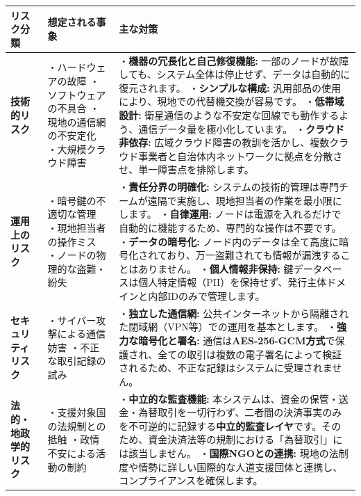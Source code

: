 \documentclass[
  a4paper,
  ja=standard,
  xelatex]{bxjsarticle}
\begin{document}
\begin{longtable}[]{@{}
  >{\raggedright\arraybackslash}p{}
  >{\raggedright\arraybackslash}p{}
  >{\raggedright\arraybackslash}p{}@{}}
\toprule\noalign{}
\begin{minipage}[b]{\linewidth}\raggedright
リスク分類
\end{minipage} & \begin{minipage}[b]{\linewidth}\raggedright
想定される事象
\end{minipage} & \begin{minipage}[b]{\linewidth}\raggedright
主な対策
\end{minipage} \\
\midrule\noalign{}
\endhead
\bottomrule\noalign{}
\endlastfoot
\textbf{技術的リスク} & ・ハードウェアの故障 ・ソフトウェアの不具合
・現地の通信網の不安定化 ・大規模クラウド障害 &
・\textbf{機器の冗長化と自己修復機能:}
一部のノードが故障しても、システム全体は停止せず、データは自動的に復元されます。
・\textbf{シンプルな構成:}
汎用部品の使用により、現地での代替機交換が容易です。
・\textbf{低帯域設計:}
衛星通信のような不安定な回線でも動作するよう、通信データ量を極小化しています。
・\textbf{クラウド非依存:}
広域クラウド障害の教訓を活かし、複数クラウド事業者と自治体内ネットワークに拠点を分散させ、単一障害点を排除します。 \\
\textbf{運用上のリスク} & ・暗号鍵の不適切な管理 ・現地担当者の操作ミス
・ノードの物理的な盗難・紛失 & ・\textbf{責任分界の明確化:}
システムの技術的管理は専門チームが遠隔で実施し、現地担当者の作業を最小限にします。
・\textbf{自律運用:}
ノードは電源を入れるだけで自動的に機能するため、専門的な操作は不要です。
・\textbf{データの暗号化:}
ノード内のデータは全て高度に暗号化されており、万一盗難されても情報が漏洩することはありません。
・\textbf{個人情報非保持:}
鍵データベースは個人特定情報（PII）を保持せず、発行主体ドメインと内部IDのみで管理します。 \\
\textbf{セキュリティリスク} & ・サイバー攻撃による通信妨害
・不正な取引記録の試み & ・\textbf{独立した通信網:}
公共インターネットから隔離された閉域網（VPN等）での運用を基本とします。
・\textbf{強力な暗号化と署名:}
通信は\textbf{AES-256-GCM方式}で保護され、全ての取引は複数の電子署名によって検証されるため、不正な記録はシステムに受理されません。 \\
\textbf{法的・地政学的リスク} & ・支援対象国の法規制との抵触
・政情不安による活動の制約 & ・\textbf{中立的な監査機能:}
本システムは、資金の保管・送金・為替取引を一切行わず、二者間の決済事実のみを不可逆的に記録する\textbf{中立的監査レイヤ}です。そのため、資金決済法等の規制における「為替取引」には該当しません。
・\textbf{国際NGOとの連携:}
現地の法制度や情勢に詳しい国際的な人道支援団体と連携し、コンプライアンスを確保します。 \\
\end{longtable}
\end{document}
